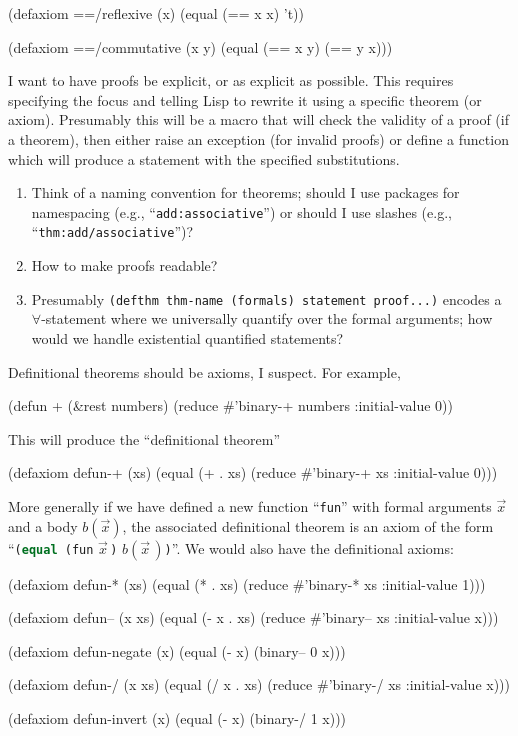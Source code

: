 \begin{code}[name=axioms]
(defaxiom ==/reflexive (x)
  (equal (== x x) 't))

(defaxiom ==/commutative (x y)
  (equal (== x y) (== y x)))
\end{code}

  
I want to have proofs be explicit, or as explicit as possible. This
requires specifying the focus and telling Lisp to rewrite it using a
specific theorem (or axiom). Presumably this will be a macro that will
check the validity of a proof (if a theorem), then either raise an
exception (for invalid proofs) or define a function which will produce a
statement with the specified substitutions.
\begin{enumerate}
\item Think of a naming convention for theorems; should I use packages
  for namespacing (e.g., ``\lstinline[language=lisp]{add:associative}'')
  or should I use slashes (e.g., ``\lstinline[language=lisp]{thm:add/associative}'')?
\item How to make proofs readable? 
\item Presumably \lstinline[language=lisp]{(defthm thm-name (formals) statement proof...)}
  encodes a $\forall$-statement where we universally quantify over the
  formal arguments; how would we handle existential quantified statements?
\end{enumerate}

\M
Definitional theorems should be axioms, I suspect. For example,
\begin{lisp-example}
(defun + (&rest numbers)
  (reduce #'binary-+ numbers :initial-value 0))
\end{lisp-example}
This will produce the ``definitional theorem''
\begin{lisp-example}
(defaxiom defun-+ (xs)
  (equal (+ . xs) (reduce #'binary-+ xs :initial-value 0)))
\end{lisp-example}
More generally if we have defined a new function
``\lstinline[language=lisp]{fun}'' with formal arguments $\vec{x}$ and a
body $b(\vec{x})$, the
associated definitional theorem is an axiom of the form
``\lstinline[language=lisp]{(equal (fun} $\vec{x}\,$\lstinline[language=lisp]{)}
$b(\vec{x}\,)$\lstinline[language=lisp]{)}''.
We would also have the definitional axioms:
\begin{lisp-example}
(defaxiom defun-* (xs)
  (equal (* . xs) (reduce #'binary-* xs :initial-value 1)))

(defaxiom defun-- (x xs)
  (equal (- x . xs) (reduce #'binary-- xs :initial-value x)))

(defaxiom defun-negate (x)
  (equal (- x) (binary-- 0 x)))

(defaxiom defun-/ (x xs)
  (equal (/ x . xs) (reduce #'binary-/ xs :initial-value x)))

(defaxiom defun-invert (x)
  (equal (- x) (binary-/ 1 x)))
\end{lisp-example}

